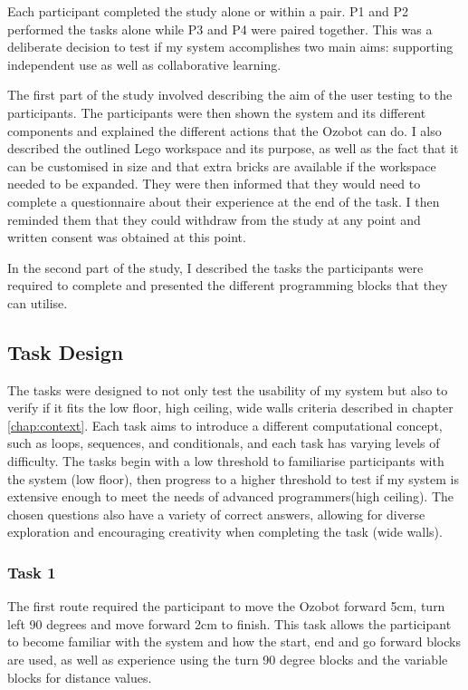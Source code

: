 \documentclass[oneside,%
                    author={Malak Hajji},
                    degree={BSc},
                    title={Designing An Accessible Ozobot Programming Platform for Students},
                  subtitle={With Mixed Visual Abilities}]{dissertation}
\begin{document}
Each participant completed the study alone or within a pair. P1 and P2 performed the tasks alone while P3 and P4 were paired together. This was a deliberate decision to test if my system accomplishes two main aims: supporting independent use as well as collaborative learning. 

The first part of the study involved describing the aim of the user testing to the participants. The participants were then shown the system and its different components and explained the different actions that the Ozobot can do. I also described the outlined Lego workspace and its purpose, as well as the fact that it can be customised in size and that extra bricks are available if the workspace needed to be expanded. They were then informed that they would need to complete a questionnaire about their experience at the end of the task. I then reminded them that they could withdraw from the study at any point and written consent was obtained at this point.

In the second part of the study, I described the tasks the participants were required to complete and presented the different programming blocks that they can utilise. 

\subsection{Task Design}
The tasks were designed to not only test the usability of my system but also to verify if it fits the low floor, high ceiling, wide walls criteria \cite{CB-lowfloor} described in chapter \ref{chap:context}. Each task aims to introduce a different computational concept, such as loops, sequences, and conditionals, and each task has varying levels of difficulty. The tasks begin with a low threshold to familiarise participants with the system (low floor), then progress to a higher threshold to test if my system is extensive enough to meet the needs of advanced programmers(high ceiling). The chosen questions also have a variety of correct answers, allowing for diverse exploration and encouraging creativity when completing the task (wide walls).

\subsubsection{Task 1}

The first route required the participant to move the Ozobot forward 5cm, turn left 90 degrees and move forward 2cm to finish. This task allows the participant to become familiar with the system and how the start, end and go forward blocks are used, as well as experience using the turn 90 degree blocks and the variable blocks for distance values.
\end{document}
